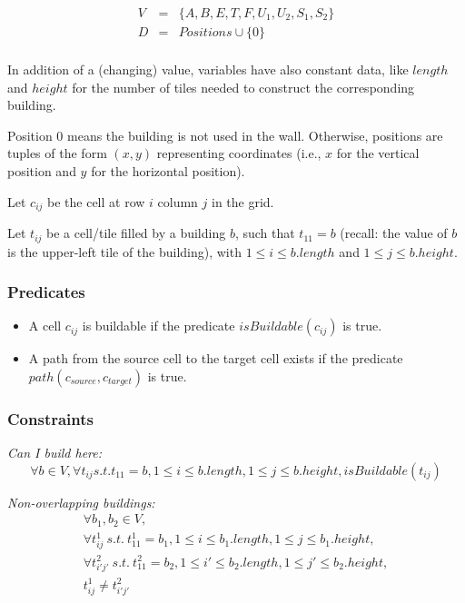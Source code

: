 \documentclass[11pt]{article}
\begin{document}
\begin{displaymath}
  \begin{array}{ccc}
    V & = & \{A, B, E, T, F, U_1, U_2, S_1, S_2\}\\
    D & = & Positions \cup \{0\}\\
  \end{array}
\end{displaymath}

In addition of a (changing)  value, variables have also constant data,
like $length$ and $height$ for the number of tiles needed to construct
the corresponding building.

Position $0$  means the building is  not used in  the wall. Otherwise,
positions  are tuples of  the form  $(x, y)$  representing coordinates
(i.e.,  $x$ for  the  vertical  position and  $y$  for the  horizontal
position). 

Let $c_{ij}$ be the cell at row $i$ column $j$ in the grid.

Let  $t_{ij}$ be  a  cell/tile filled  by  a building  $b$, such  that
$t_{11} = b$  (recall: the value of $b$ is the  upper-left tile of the
building), with $1 \leq i \leq b.length$ and $1 \leq j \leq b.height$.


\subsubsection{Predicates}

\begin{itemize}
\item A cell $c_{ij}$ is buildable if the predicate {\bf $isBuildable(c_{ij})$} is
  true.
\item A  path from the  source cell to  the target cell exists  if the
  predicate {\bf $path(c_{source}, c_{target})$} is true.
\end{itemize}

\subsubsection{Constraints}

{\em Can I build here:}
\begin{displaymath}
  \forall  b \in V,  \forall t_{ij}  s.t. t_{11}  = b,  1 \leq  i \leq
  b.length, 1 \leq j \leq b.height, isBuildable(t_{ij})
\end{displaymath}

\noindent
{\em Non-overlapping buildings:}
\begin{displaymath}
  \begin{array}{l}
    \forall b_1, b_2 \in V,\\
    \forall t^1_{ij}\  s.t.\ t^1_{11} = b_1,  1 \leq i  \leq b_1.length, 1
    \leq j \leq b_1.height,\\
    \forall t^2_{i'j'}\ s.t.\ t^2_{11} = b_2, 1 \leq i' \leq b_2.length, 1
    \leq j' \leq b_2.height,\\
    t^1_{ij} \neq t^2_{i'j'}
  \end{array}
\end{displaymath}
\end{document}
